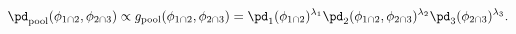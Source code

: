 \begin{equation}
  \pd_{\text{pool}} (\phi_{1 \cap 2}, \phi_{2 \cap 3}) \propto
  g_{\text{pool}}(\phi_{1 \cap 2}, \phi_{2 \cap 3}) =
  \pd_{1}(\phi_{1 \cap 2})^{\lambda_{1}} 
  \pd_{2}(\phi_{1 \cap 2}, \phi_{2 \cap 3})^{\lambda_{2}}
  \pd_{3}(\phi_{2 \cap 3})^{\lambda_{3}}.
  \label{eqn:pooled-prior-overall}
\end{equation}
